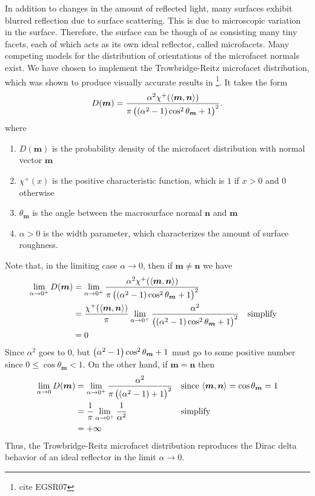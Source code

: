 \documentclass[12pt]{article}
\DeclarePairedDelimiter\ip{\langle }{\rangle}
\begin{document}
In addition to changes in the amount of reflected light, many surfaces exhibit blurred reflection due to surface scattering.
This is due to microscopic variation in the surface.
Therefore, the surface can be though of as consisting many tiny facets, each of which acts as its own ideal reflector, called microfacets.
Many competing models for the distribution of orientations of the microfacet normals exist.
We have chosen to implement the Trowbridge-Reitz microfacet distribution, which was shown to produce visually accurate results in \footnote{cite EGSR07}.
It takes the form
\[D(\bm m) = \frac{\alpha^2 \chi^+(\ip{\bm m, \bm n})}{\pi\del{\del{\alpha^2 - 1}\cos^2 \theta_{\bm m} + 1}^2}.\]
where
\begin{enumerate}
\item \(D(\bm m)\) is the probability density of the microfacet distribution with normal vector \(\bm m\)
\item \(\chi^+(x)\) is the positive characteristic function, which is \(1\) if \(x>0\) and \(0\) otherwise
\item \(\theta_{\bm m}\) is the angle between the macrosurface normal \(\bm n\) and \(\bm m\)
\item \(\alpha > 0\) is the width parameter, which characterizes the amount of surface roughness.
\end{enumerate}
Note that, in the limiting case \(\alpha \to 0\), then if \(\bm m \neq \bm n\) we have
\begin{align*}
  \lim_{\alpha \to 0^+}D(\bm m)
  &= \lim_{\alpha \to 0^+}\frac{\alpha^2 \chi^+(\ip{\bm m, \bm n})}{\pi\del{\del{\alpha^2 - 1}\cos^2 \theta_{\bm m} + 1}^2}\\
  &= \frac{ \chi^+(\ip{\bm m, \bm n})}{\pi}\lim_{\alpha \to 0^+}\frac{\alpha^2}{\del{\del{\alpha^2 - 1}\cos^2 \theta_{\bm m} + 1}^2} && \text{simplify}\\
  &= 0
\end{align*}
Since \(\alpha^2\) goes to \(0\), but \(\del{\alpha^2 - 1}\cos^2 \theta_{\bm m} + 1\) must go to some positive number since \(0 \leq \cos\theta_{\bm m} < 1\).
On the other hand, if \(\bm m = \bm n\) then
\begin{align*}
  \lim_{\alpha \to 0}D(\bm m)
  &= \lim_{\alpha \to 0^+}\frac{\alpha^2}{\pi\del{\del{\alpha^2 - 1} + 1}^2} && \text{since \(\ip{\bm m, \bm n} = \cos \theta_{\bm m} = 1\)}\\
  &= \frac{1}{\pi}\lim_{\alpha \to 0^+}\frac{1}{\alpha^2} && \text{simplify}\\
  &= +\infty
\end{align*}
Thus, the Trowbridge-Reitz microfacet distribution reproduces the Dirac delta behavior of an ideal reflector in the limit \(\alpha \to 0\).
\end{document}
